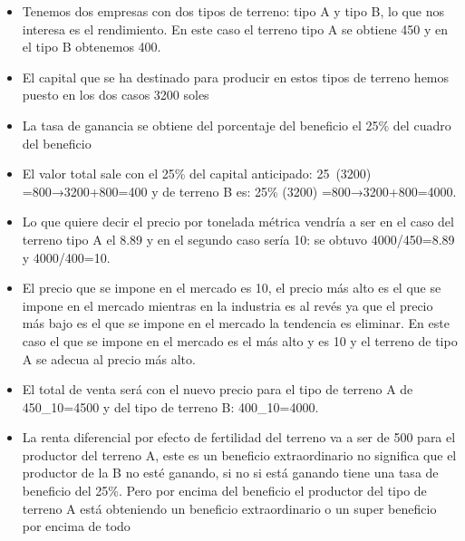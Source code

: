\documentclass[
  letterpaper,
  DIV=11,
  numbers=noendperiod]{scrartcl}
\begin{document}
\begin{itemize}
\item
  Tenemos dos empresas con dos tipos de terreno: tipo A y tipo B, lo que
  nos interesa es el rendimiento. En este caso el terreno tipo A se
  obtiene 450 y en el tipo B obtenemos 400.
\item
  El capital que se ha destinado para producir en estos tipos de terreno
  hemos puesto en los dos casos 3200 soles
\item
  La tasa de ganancia se obtiene del porcentaje del beneficio el 25\%
  del cuadro del beneficio
\item
  El valor total sale con el 25\% del capital anticipado: 25\        (3200)
  =800→3200+800=400 y de terreno B es: 25\% (3200) =800→3200+800=4000.
\item
  Lo que quiere decir el precio por tonelada métrica vendría a ser en el
  caso del terreno tipo A el 8.89 y en el segundo caso sería 10: se
  obtuvo 4000/450=8.89 y 4000/400=10.
\item
  El precio que se impone en el mercado es 10, el precio más alto es el
  que se impone en el mercado mientras en la industria es al revés ya
  que el precio más bajo es el que se impone en el mercado la tendencia
  es eliminar. En este caso el que se impone en el mercado es el más
  alto y es 10 y el terreno de tipo A se adecua al precio más alto.
\item
  El total de venta será con el nuevo precio para el tipo de terreno A
  de 450\_10=4500 y del tipo de terreno B: 400\_10=4000.
\item
  La renta diferencial por efecto de fertilidad del terreno va a ser de
  500 para el productor del terreno A, este es un beneficio
  extraordinario no significa que el productor de la B no esté ganando,
  si no si está ganando tiene una tasa de beneficio del 25\%. Pero por
  encima del beneficio el productor del tipo de terreno A está
  obteniendo un beneficio extraordinario o un super beneficio por encima
  de todo
\end{itemize}
\end{document}
